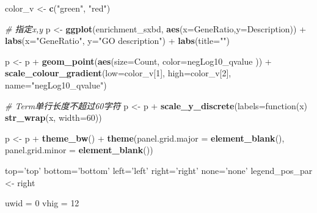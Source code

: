 \documentclass[]{article}
\newenvironment{Shaded}{\begin{snugshade}}{\end{snugshade}}
\newcommand{\KeywordTok}[1]{\textcolor[rgb]{0.13,0.29,0.53}{\textbf{{#1}}}}
\newcommand{\DataTypeTok}[1]{\textcolor[rgb]{0.13,0.29,0.53}{{#1}}}
\newcommand{\DecValTok}[1]{\textcolor[rgb]{0.00,0.00,0.81}{{#1}}}
\newcommand{\StringTok}[1]{\textcolor[rgb]{0.31,0.60,0.02}{{#1}}}
\newcommand{\CommentTok}[1]{\textcolor[rgb]{0.56,0.35,0.01}{\textit{{#1}}}}
\newcommand{\NormalTok}[1]{{#1}}
\numberwithin{figure}{section}
\numberwithin{table}{section}
\theoremstyle{definition}
\theoremstyle{definition}
\theoremstyle{definition}
\theoremstyle{remark}
\begin{document}
\begin{Shaded}
\begin{Highlighting}[]
\NormalTok{color_v <-}\StringTok{ }\KeywordTok{c}\NormalTok{(}\StringTok{"green"}\NormalTok{, }\StringTok{"red"}\NormalTok{)}

\CommentTok{# 指定x,y}
\NormalTok{p <-}\StringTok{ }\KeywordTok{ggplot}\NormalTok{(enrichment_sxbd, }\KeywordTok{aes}\NormalTok{(}\DataTypeTok{x=}\NormalTok{GeneRatio,}\DataTypeTok{y=}\NormalTok{Description)) +}\StringTok{ }
\StringTok{    }\KeywordTok{labs}\NormalTok{(}\DataTypeTok{x=}\StringTok{"GeneRatio"}\NormalTok{, }\DataTypeTok{y=}\StringTok{"GO description"}\NormalTok{) +}\StringTok{ }\KeywordTok{labs}\NormalTok{(}\DataTypeTok{title=}\StringTok{""}\NormalTok{)}

\NormalTok{p <-}\StringTok{ }\NormalTok{p +}\StringTok{ }\KeywordTok{geom_point}\NormalTok{(}\KeywordTok{aes}\NormalTok{(}\DataTypeTok{size=}\NormalTok{Count, }\DataTypeTok{color=}\NormalTok{negLog10_qvalue )) +}\StringTok{ }
\StringTok{    }\KeywordTok{scale_colour_gradient}\NormalTok{(}\DataTypeTok{low=}\NormalTok{color_v[}\DecValTok{1}\NormalTok{], }\DataTypeTok{high=}\NormalTok{color_v[}\DecValTok{2}\NormalTok{], }\DataTypeTok{name=}\StringTok{"negLog10_qvalue"}\NormalTok{)}

\CommentTok{# Term单行长度不超过60字符}
\NormalTok{p <-}\StringTok{ }\NormalTok{p +}\StringTok{ }\KeywordTok{scale_y_discrete}\NormalTok{(}\DataTypeTok{labels=}\NormalTok{function(x) }\KeywordTok{str_wrap}\NormalTok{(x, }\DataTypeTok{width=}\DecValTok{60}\NormalTok{))}

\NormalTok{p <-}\StringTok{ }\NormalTok{p +}\StringTok{ }\KeywordTok{theme_bw}\NormalTok{() +}\StringTok{ }
\StringTok{    }\KeywordTok{theme}\NormalTok{(}\DataTypeTok{panel.grid.major =} \KeywordTok{element_blank}\NormalTok{(), }\DataTypeTok{panel.grid.minor =} \KeywordTok{element_blank}\NormalTok{())}


\NormalTok{top=}\StringTok{'top'}
\NormalTok{bottom=}\StringTok{'bottom'}
\NormalTok{left=}\StringTok{'left'}
\NormalTok{right=}\StringTok{'right'}
\NormalTok{none=}\StringTok{'none'}
\NormalTok{legend_pos_par <-}\StringTok{ }\NormalTok{right}


\NormalTok{uwid =}\StringTok{ }\DecValTok{0}
\NormalTok{vhig =}\StringTok{ }\DecValTok{12}


\end{Highlighting}
\end{Shaded}
\end{document}
